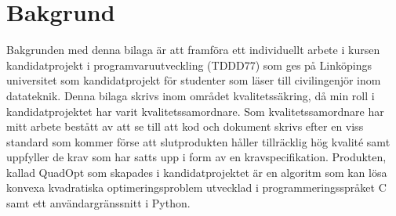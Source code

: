 \section{Bakgrund}
Bakgrunden med denna bilaga är att framföra ett individuellt arbete i kursen kandidatprojekt i programvaruutveckling (TDDD77) som ges på Linköpings universitet som kandidatprojekt för studenter som läser till civilingenjör inom datateknik. 
\newline
\newline
Denna bilaga skrivs inom området kvalitetssäkring, då min roll i kandidatprojektet har varit kvalitetssamordnare. Som kvalitetssamordnare har mitt arbete bestått av att se till att kod och dokument skrivs efter en viss standard som kommer förse att slutprodukten håller tillräcklig hög kvalité samt uppfyller de krav som har satts upp i form av en kravspecifikation.
\newline
\newline
Produkten, kallad QuadOpt som skapades i kandidatprojektet är en algoritm som kan lösa konvexa kvadratiska optimeringsproblem utvecklad i programmeringsspråket C samt ett användargränssnitt i Python. 
